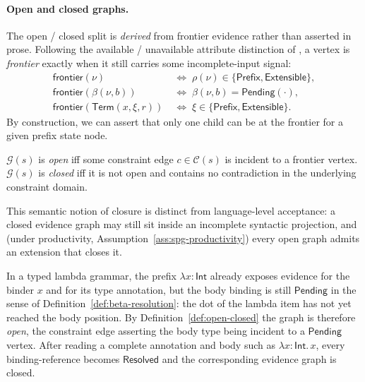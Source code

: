 \paragraph{Open and closed graphs.}
The open / closed split is \emph{derived} from frontier evidence rather than asserted in prose. Following the available / unavailable attribute distinction of \cite{demers1981incremental}, a vertex is \emph{frontier} exactly when it still carries some incomplete-input signal:
\[
  \begin{aligned}
  \mathsf{frontier}(\nu) \;&\Longleftrightarrow\; \rho(\nu)\in\{\mathsf{Prefix},\mathsf{Extensible}\}, \\
  \mathsf{frontier}(\beta(\nu,b)) \;&\Longleftrightarrow\; \beta(\nu,b)=\mathsf{Pending}(\cdot), \\
  \mathsf{frontier}(\mathsf{Term}(x,\xi,r)) \;&\Longleftrightarrow\; \xi\in\{\mathsf{Prefix},\mathsf{Extensible}\}.
  \end{aligned}
\]
By construction, we can assert that only one child can be at the frontier for a given prefix state node.
\begin{definition}
\label{def:open-closed}
$\mathcal G(s)$ is \emph{open} iff some constraint edge $c \in \mathcal C(s)$ is incident to a frontier vertex. $\mathcal G(s)$ is \emph{closed} iff it is not open and contains no contradiction in the underlying constraint domain.
\end{definition}

This semantic notion of closure is distinct from language-level acceptance: a closed evidence graph may still sit inside an incomplete syntactic projection, and (under productivity, Assumption~\ref{ass:spg-productivity}) every open graph admits an extension that closes it.

\begin{example}
\label{ex:open-closed-lambda}
In a typed lambda grammar, the prefix $\lambda x : \mathsf{Int}$ already exposes evidence for the binder $x$ and for its type annotation, but the body binding is still $\mathsf{Pending}$ in the sense of Definition~\ref{def:beta-resolution}: the dot of the lambda item has not yet reached the body position. By Definition~\ref{def:open-closed} the graph is therefore \emph{open}, the constraint edge asserting the body type being incident to a $\mathsf{Pending}$ vertex. After reading a complete annotation and body such as $\lambda x : \mathsf{Int}.\,x$, every binding-reference becomes $\mathsf{Resolved}$ and the corresponding evidence graph is closed.
\end{example}

